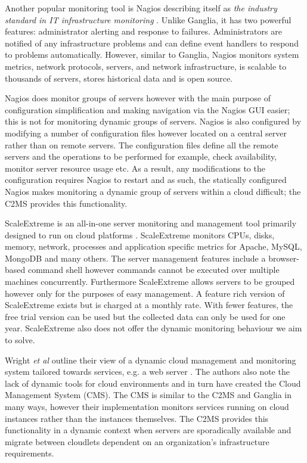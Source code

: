 \documentclass[10pt, conference, compsocconf]{IEEEtran}
\begin{document}
Another popular monitoring tool is Nagios describing itself as \textit{the industry standard in IT infrastructure monitoring} \cite{nagios}. Unlike Ganglia, it has two powerful features: administrator alerting and response to failures. Administrators are notified of any infrastructure problems and can define event handlers to respond to problems automatically. However, similar to Ganglia, Nagios monitors system metrics, network protocols, servers, and network infrastructure, is scalable to thousands of servers, stores historical data and is open source. 

Nagios does monitor groups of servers however with the main purpose of configuration simplification and making navigation via the Nagios GUI easier; this is not for monitoring dynamic groups of servers. Nagios is also configured by modifying a number of configuration files however located on a central server rather than on remote servers. The configuration files define all the remote servers and the operations to be performed for example, check availability, monitor server resource usage etc. As a result, any modifications to the configuration requires Nagios to restart and as such, the statically configured Nagios makes monitoring a dynamic group of servers within a cloud difficult; the C2MS provides this functionality.

ScaleExtreme is an all-in-one server monitoring and management tool primarily designed to run on cloud platforms \cite{scalextreme}. ScaleExtreme monitors CPUs, disks, memory, network, processes and application specific metrics for Apache, MySQL, MongoDB and many others. The server management features include a browser-based command shell however commands cannot be executed over multiple machines concurrently. Furthermore ScaleExtreme allows servers to be grouped however only for the purposes of easy management. A feature rich version of ScaleExtreme exists but is charged at a monthly rate. With fewer features, the free trial version can be used but the collected data can only be used for one year. ScaleExtreme also does not offer the dynamic monitoring behaviour we aim to solve. 

Wright \textit{et al} outline their view of a dynamic cloud management and monitoring system tailored towards services, e.g. a web server \cite{Wright2010}. The authors also note the lack of dynamic tools for cloud environments and in turn have created the Cloud Management System (CMS). The CMS is similar to the C2MS and Ganglia in many ways, however their implementation monitors services running on cloud instances rather than the instances themselves. The C2MS provides this functionality in a dynamic context when servers are sporadically available and migrate between cloudlets dependent on an organization's infrastructure requirements.
\end{document}
